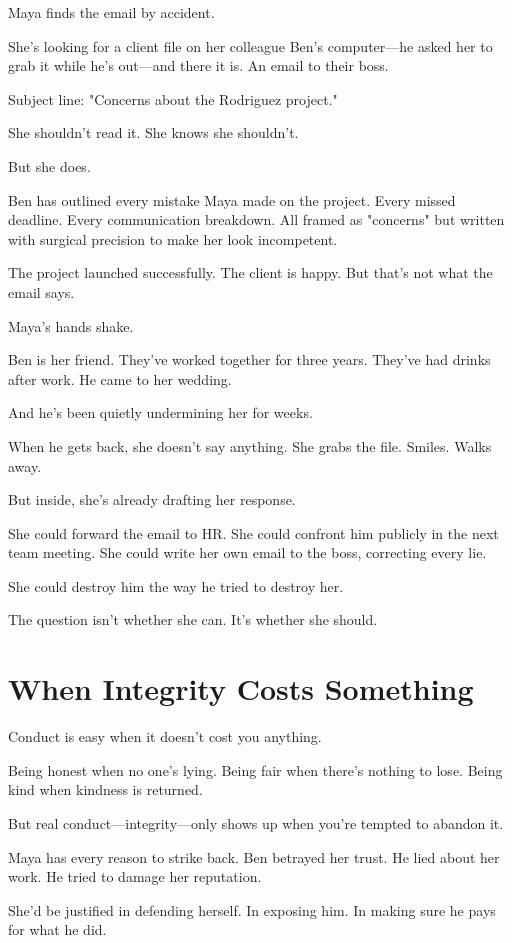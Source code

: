 \documentclass[11pt,twoside]{book}
\begin{document}
Maya finds the email by accident.

She's looking for a client file on her colleague Ben's computer—he asked her to grab it while he's out—and there it is. An email to their boss.

Subject line: "Concerns about the Rodriguez project."

She shouldn't read it. She knows she shouldn't.

But she does.

Ben has outlined every mistake Maya made on the project. Every missed deadline. Every communication breakdown. All framed as "concerns" but written with surgical precision to make her look incompetent.

The project launched successfully. The client is happy. But that's not what the email says.

Maya's hands shake.

Ben is her friend. They've worked together for three years. They've had drinks after work. He came to her wedding.

And he's been quietly undermining her for weeks.

When he gets back, she doesn't say anything. She grabs the file. Smiles. Walks away.

But inside, she's already drafting her response.

She could forward the email to HR. She could confront him publicly in the next team meeting. She could write her own email to the boss, correcting every lie.

She could destroy him the way he tried to destroy her.

The question isn't whether she can. It's whether she should.

\section*{When Integrity Costs Something}

Conduct is easy when it doesn't cost you anything.

Being honest when no one's lying. Being fair when there's nothing to lose. Being kind when kindness is returned.

But real conduct—integrity—only shows up when you're tempted to abandon it.

Maya has every reason to strike back. Ben betrayed her trust. He lied about her work. He tried to damage her reputation.

She'd be justified in defending herself. In exposing him. In making sure he pays for what he did.
\end{document}
